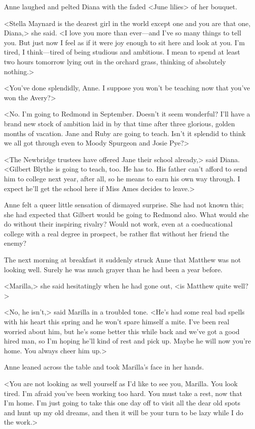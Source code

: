 Anne laughed and pelted Diana with the faded <June lilies> of her bouquet.

<Stella Maynard is the dearest girl in the world except one and you are that one, Diana,> she said. <I love you more than ever—and I've so many things to tell you. But just now I feel as if it were joy enough to sit here and look at you. I'm tired, I think—tired of being studious and ambitious. I mean to spend at least two hours tomorrow lying out in the orchard grass, thinking of absolutely nothing.>

<You've done splendidly, Anne. I suppose you won't be teaching now that you've won the Avery?>

<No. I'm going to Redmond in September. Doesn't it seem wonderful? I'll have a brand new stock of ambition laid in by that time after three glorious, golden months of vacation. Jane and Ruby are going to teach. Isn't it splendid to think we all got through even to Moody Spurgeon and Josie Pye?>

<The Newbridge trustees have offered Jane their school already,> said Diana. <Gilbert Blythe is going to teach, too. He has to. His father can't afford to send him to college next year, after all, so he means to earn his own way through. I expect he'll get the school here if Miss Ames decides to leave.>

Anne felt a queer little sensation of dismayed surprise. She had not known this; she had expected that Gilbert would be going to Redmond also. What would she do without their inspiring rivalry? Would not work, even at a coeducational college with a real degree in prospect, be rather flat without her friend the enemy?

The next morning at breakfast it suddenly struck Anne that Matthew was not looking well. Surely he was much grayer than he had been a year before.

<Marilla,> she said hesitatingly when he had gone out, <is Matthew quite well?>

<No, he isn't,> said Marilla in a troubled tone. <He's had some real bad spells with his heart this spring and he won't spare himself a mite. I've been real worried about him, but he's some better this while back and we've got a good hired man, so I'm hoping he'll kind of rest and pick up. Maybe he will now you're home. You always cheer him up.>

Anne leaned across the table and took Marilla's face in her hands.

<You are not looking as well yourself as I'd like to see you, Marilla. You look tired. I'm afraid you've been working too hard. You must take a rest, now that I'm home. I'm just going to take this one day off to visit all the dear old spots and hunt up my old dreams, and then it will be your turn to be lazy while I do the work.>

